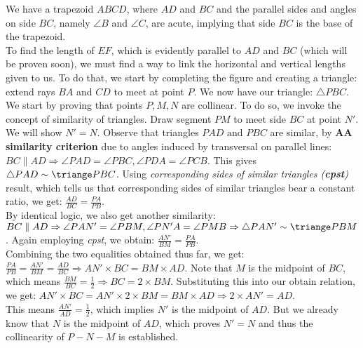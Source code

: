 We have a trapezoid \(ABCD\), where \(AD\) and \(BC\) and the parallel sides and angles on side \(BC\), namely \(\angle B\) and \(\angle C\), are acute, implying that side \(BC\) is the base of the trapezoid.
\\
To find the length of \(EF\), which is evidently parallel to \(AD\) and \(BC\) (which will be proven soon), we must find a way to link the horizontal and vertical lengths given to us. To do that, we start by completing the figure and creating a triangle: extend rays \(BA\) and \(CD\) to meet at point \(P\). We now have our triangle: \(\triangle PBC\).
\\
We start by proving that points \(P,M,N\) are collinear. To do so, we invoke the concept of similarity of triangles. Draw segment \(PM\) to meet side \(BC\) at point \(N'\). We will show \(N'=N\). Observe that triangles \(PAD \text{ and } PBC\) are similar, by \textbf{AA similarity criterion} due to angles induced by transversal on parallel lines: \(BC \parallel AD \Rightarrow \angle PAD = \angle PBC, \angle PDA = \angle PCB\). This gives \(\triangle PAD \sim \triange PBC \). Using \textit{corresponding sides of similar triangles (\textbf{cpst})} result, which tells us that corresponding sides of similar triangles bear a constant ratio, we get: \(\frac{AD}{BC} = \frac{PA}{PB}\). 
\\
By identical logic, we also get another similarity: \(BC \parallel AD \Rightarrow \angle PAN' = \angle PBM, \angle PN'A = \angle PMB \Rightarrow \triangle PAN' \sim \triange PBM\). Again employing \textit{cpst}, we obtain: \(\frac{AN'}{BM} = \frac{PA}{PB}\).
\\
Combining the two equalities obtained thus far, we get: \(\frac{PA}{PB} = \frac{AN'}{BM} = \frac{AD}{BC} \Rightarrow AN'\times BC = BM \times AD\). Note that \(M\) is the midpoint of \(BC\), which means \(\frac{BM}{BC} =\frac{1}{2} \Rightarrow BC = 2\times BM\). Substituting this into our obtain relation, we get: \(AN'\times BC = AN' \times 2 \times BM = BM \times AD \Rightarrow 2\times AN' = AD \). 
\\
This means \(\frac{AN'}{AD} = \frac{1}{2} \), which implies \(N'\) is the midpoint of \(AD\). But we already know that \(N\) is the midpoint of \(AD\), which proves \(N'=N\) and thus the collinearity of \(P-N-M\) is established.

